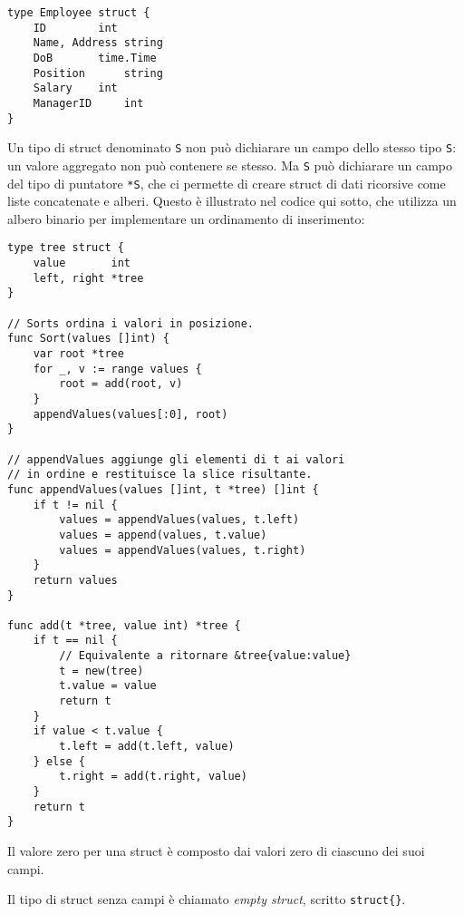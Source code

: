 \documentclass[../../thesis.tex]{subfiles}
\begin{document}
    \begin{lstlisting}[frame = single,label={lst:lstlisting3-4.6}]
type Employee struct {
    ID		  int
    Name, Address string
    DoB		  time.Time
    Position	  string
    Salary	  int
    ManagerID	  int
}
    \end{lstlisting}
    Un tipo di struct denominato \verb"S" non può dichiarare un campo dello stesso tipo \verb"S": un valore aggregato non può contenere se stesso.
    Ma \verb"S" può dichiarare un campo del tipo di puntatore \verb"*S", che ci permette di creare struct di dati ricorsive come liste concatenate e alberi.
    Questo è illustrato nel codice qui sotto, che utilizza un albero binario per implementare un ordinamento di inserimento:
    \begin{lstlisting}[frame = single,label={lst:lstlisting3-4.7}]
type tree struct {
    value       int
    left, right *tree
}

// Sorts ordina i valori in posizione.
func Sort(values []int) {
    var root *tree
    for _, v := range values {
        root = add(root, v)
    }
    appendValues(values[:0], root)
}

// appendValues aggiunge gli elementi di t ai valori
// in ordine e restituisce la slice risultante.
func appendValues(values []int, t *tree) []int {
    if t != nil {
        values = appendValues(values, t.left)
        values = append(values, t.value)
        values = appendValues(values, t.right)
    }
    return values
}

func add(t *tree, value int) *tree {
    if t == nil {
        // Equivalente a ritornare &tree{value:value}
        t = new(tree)
        t.value = value
        return t
    }
    if value < t.value {
        t.left = add(t.left, value)
    } else {
        t.right = add(t.right, value)
    }
    return t
}
    \end{lstlisting}
    Il valore zero per una struct è composto dai valori zero di ciascuno dei suoi campi.

    Il tipo di struct senza campi è chiamato \textit{empty struct}, scritto \verb"struct{}".
    
    
    
\end{document}
